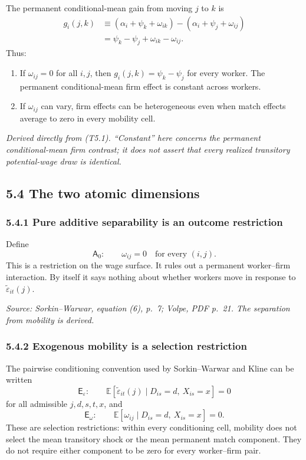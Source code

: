 \documentclass[11pt]{article}
\begin{document}
The permanent conditional-mean gain from moving \(j\) to \(k\) is
\[
\begin{aligned}
g_i(j,k)
&\equiv
\left(\alpha_i+\psi_k+\omega_{ik}\right)
-\left(\alpha_i+\psi_j+\omega_{ij}\right)\\
&=
\psi_k-\psi_j+\omega_{ik}-\omega_{ij}.
\end{aligned}
\tag{T5.4}
\]
Thus:

\begin{enumerate}
\item If \(\omega_{ij}=0\) for all \(i,j\), then
  \(g_i(j,k)=\psi_k-\psi_j\) for every worker.  The permanent
  conditional-mean firm effect is constant across workers.
\item If \(\omega_{ij}\) can vary, firm effects can be heterogeneous even
  when match effects average to zero in every mobility cell.
\end{enumerate}

\textit{Derived directly from (T5.1).  ``Constant'' here concerns the
permanent conditional-mean firm contrast; it does not assert that every
realized transitory potential-wage draw is identical.}

\subsection{5.4 The two atomic dimensions}

\subsubsection{5.4.1 Pure additive separability is an outcome restriction}

Define
\[
\mathsf A_0:
\qquad
\omega_{ij}=0
\quad\text{for every }(i,j).
\tag{T5.5}
\]
This is a restriction on the wage surface.  It rules out a permanent
worker--firm interaction.  By itself it says nothing about whether workers
move in response to \(\widetilde\varepsilon_{it}(j)\).

\textit{Source: Sorkin--Warwar, equation (6), p.\ 7; Volpe, PDF p.\ 21.
The separation from mobility is derived.}

\subsubsection{5.4.2 Exogenous mobility is a selection restriction}

The pairwise conditioning convention used by Sorkin--Warwar and Kline can be
written
\[
\mathsf E_\varepsilon:
\qquad
\mathbb E[
\widetilde\varepsilon_{it}(j)
\mid
D_{is}=d,\ X_{is}=x
]
=0
\tag{T5.6}
\]
for all admissible \(j,d,s,t,x\), and
\[
\mathsf E_\omega:
\qquad
\mathbb E[
\omega_{ij}
\mid
D_{is}=d,\ X_{is}=x
]
=0.
\tag{T5.7}
\]
These are selection restrictions: within every conditioning cell, mobility
does not select the mean transitory shock or the mean permanent match
component.  They do not require either component to be zero for every
worker--firm pair.
\end{document}
